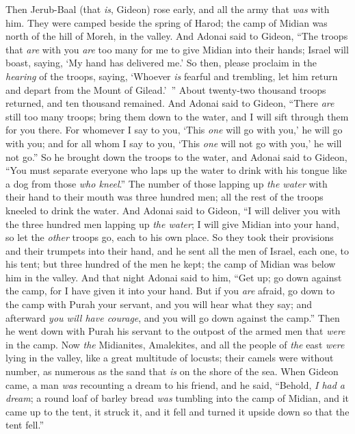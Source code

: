 \begin{biblechapter} %
 Then Jerub-Baal (that \textit{is}, Gideon) rose early, and all the army that \textit{was} with him. They were camped beside the spring of Harod; the camp of Midian was north of the hill of Moreh, in the valley.
\verse And Adonai said to Gideon, “The troops that \textit{are} with you \textit{are} too many for me to give Midian into their hands; Israel will boast, saying, ‘My hand has delivered me.’
\verse So then, please proclaim in the \textit{hearing} of the troops, saying, ‘Whoever \textit{is} fearful and trembling, let him return and depart from the Mount of Gilead.’ ” About twenty-two thousand troops returned, and ten thousand remained.
\verse And Adonai said to Gideon, “There \textit{are} still too many troops; bring them down to the water, and I will sift through them for you there. For whomever I say to you, ‘This \textit{one} will go with you,’ he will go with you; and for all whom I say to you, ‘This \textit{one} will not go with you,’ he will not go.”
\verse So he brought down the troops to the water, and Adonai said to Gideon, “You must separate everyone who laps up the water to drink with his tongue like a dog from those \textit{who kneel}.”
\verse The number of those lapping up \textit{the water} with their hand to their mouth was three hundred men; all the rest of the troops kneeled to drink the water.
\verse And Adonai said to Gideon, “I will deliver you with the three hundred men lapping up \textit{the water}; I will give Midian into your hand, so let the \textit{other} troops go, each to his own place.
\verse So they took their provisions and their trumpets into their hand, and he sent all the men of Israel, each one, to his tent; but three hundred of the men he kept; the camp of Midian was below him in the valley.
\verse And that night Adonai said to him, “Get up; go down against the camp, for I have given it into your hand.
\verse But if you \textit{are} afraid, go down to the camp with Purah your servant,
\verse and you will hear what they say; and afterward \textit{you will have courage}, and you will go down against the camp.” Then he went down with Purah his servant to the outpost of the armed men that \textit{were} in the camp.
\verse Now \textit{the} Midianites, Amalekites, and all the people of \textit{the} east \textit{were} lying in the valley, like a great multitude of locusts; their camels were without number, as numerous as the sand that \textit{is} on the shore of the sea.
\verse When Gideon came, a man \textit{was} recounting a dream to his friend, and he said, “Behold, \textit{I had a dream}; a round loaf of barley bread \textit{was} tumbling into the camp of Midian, and it came up to the tent, it struck it, and it fell and turned it upside down so that the tent fell.”

\end{biblechapter}
